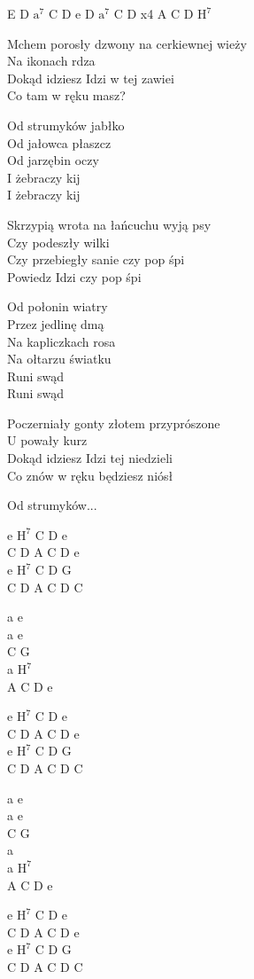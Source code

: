 \begin{text}
\ifchorded E D $\mathrm{a^7}$ C D e D $\mathrm{a^7}$ C D x4 A C D $\mathrm{H^7}$ \else\fi

Mchem porosły dzwony na cerkiewnej wieży\\
Na ikonach rdza\\
Dokąd idziesz Idzi w tej zawiei\\
Co tam w ręku masz?

\vin Od strumyków jabłko\\
\vin Od jałowca płaszcz\\
\vin Od jarzębin oczy\\
\vin I żebraczy kij\\
\vin I żebraczy kij

Skrzypią wrota na łańcuchu wyją psy\\
Czy podeszły wilki\\
Czy przebiegły sanie czy pop śpi\\
Powiedz Idzi czy pop śpi

\vin Od połonin wiatry\\
\vin Przez jedlinę dmą\\
\vin Na kapliczkach rosa\\
\vin Na ołtarzu światku\\
\vin Runi swąd\\
\vin Runi swąd

Poczerniały gonty złotem przyprószone\\
U powały kurz\\
Dokąd idziesz Idzi tej niedzieli\\
Co znów w ręku będziesz niósł

\vin Od strumyków...
\end{text}
\begin{chord}
    \hfill\break
    \hfill\break
    e $\mathrm{H^7}$ C D e\\
    C D A C D e\\
    e $\mathrm{H^7}$ C D G\\
    C D A C D C

    a e\\
    a e\\
    C G\\
    a $\mathrm{H^7}$\\
    A C D e

    e $\mathrm{H^7}$ C D e\\
    C D A C D e\\
    e $\mathrm{H^7}$ C D G\\
    C D A C D C

    a e\\
    a e\\
    C G\\
    a\\
    a $\mathrm{H^7}$\\
    A C D e

    e $\mathrm{H^7}$ C D e\\
    C D A C D e\\
    e $\mathrm{H^7}$ C D G\\
    C D A C D C
\end{chord}
